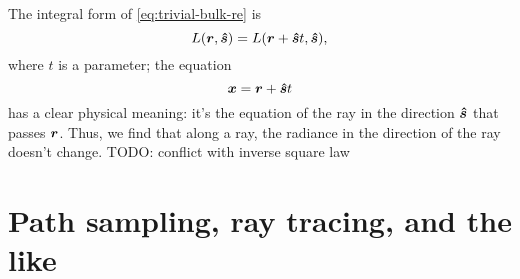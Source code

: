 \documentclass[hyperref, a4paper]{article}
\begin{document}
The integral form of \eqref{eq:trivial-bulk-re} is 
\begin{equation}
    L(\vb*{r}, \vu*{s}) = L(\vb*{r} + \vu*{s} t , \vu*{s}),
\end{equation}
where $t$ is a parameter; the equation 
\begin{equation}
    \vb*{x} = \vb*{r} + \vu*{s} t 
\end{equation}
has a clear physical meaning: it's the equation of the ray 
in the direction $\vu*{s}$ that passes $\vb*{r}$.
Thus, we find that along a ray, 
the radiance in the direction of the ray doesn't change. 
TODO: conflict with inverse square law 

\section{Path sampling, ray tracing, and the like}
\end{document}
